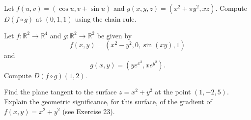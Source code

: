\documentclass[openany]{book}
\begin{document}
\begin{prob}[5]
    Let \( f(u, v) = (\cos u, v + \sin u) \) and  
    \( g(x, y, z) = (x^2 + \pi y^2, xz) \). Compute \( D(f \circ g) \) at \((0, 1, 1)\) using the chain rule.
\end{prob}

\begin{prob}[20]
    Let \( f: \mathbb{R}^2 \rightarrow \mathbb{R}^4 \) and \( g: \mathbb{R}^2 \rightarrow \mathbb{R}^2 \) be given by
    \[
    f(x, y) = (x^2 - y^2, 0, \sin(xy), 1)
    \]
    and
    \[
    g(x, y) = (ye^{x^2}, xe^{y^2}).
    \]
    Compute \( D(f \circ g)(1, 2) \).
\end{prob}


\begin{prob}[24]
    Find the plane tangent to the surface \( z = x^2 + y^2 \) at the point \( (1, -2, 5) \). Explain the geometric significance, for this surface, of the gradient of \( f(x, y) = x^2 + y^2 \) (see Exercise 23).
\end{prob}
\end{document}
